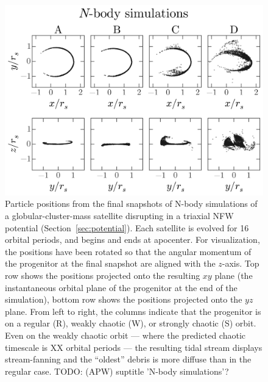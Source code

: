 \documentclass[letterpaper,12pt,preprint]{aastex}
\newcommand{\todo}[2]{{\color{red} TODO: (\MakeUppercase{#1}) #2}}
\begin{document}
\begin{figure}[p]
\begin{center}
\includegraphics[width=\textwidth]{figures/nbody.png}
\caption{Particle positions from the final snapshots of N-body simulations of a globular-cluster-mass satellite disrupting in a triaxial NFW potential (Section~\ref{sec:potential}). Each satellite is evolved for 16 orbital periods, and begins and ends at apocenter. For visualization, the positions have been rotated so that the angular momentum of the progenitor at the final snapshot are aligned with the $z$-axis. Top row shows the positions projected onto the resulting $xy$ plane (the instantaneous orbital plane of the progenitor at the end of the simulation), bottom row shows the positions projected onto the $yz$ plane. From left to right, the columns indicate that the progenitor is on a regular (R), weakly chaotic (W), or strongly chaotic (S) orbit. Even on the weakly chaotic orbit --- where the predicted chaotic timescale is XX orbital periods --- the resulting tidal stream displays stream-fanning and the ``oldest'' debris is more diffuse than in the regular case. \todo{apw}{suptitle 'N-body simulations'?}} \label{fig:nbodysims}
\end{center}
\end{figure}
\end{document}
